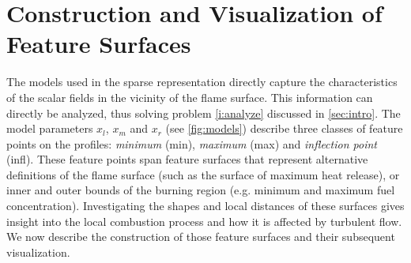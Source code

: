 \section{Construction and Visualization of Feature Surfaces}
\label{sec:visualization}
%
The models used in the sparse representation directly capture the
characteristics of the scalar fields in the vicinity of the flame surface. This
information can directly be analyzed, thus solving problem \ref{i:analyze}
discussed in \cref{sec:intro}. The model parameters $x_l$, $x_m$ and $x_r$ (see
\cref{fig:models}) describe three classes of feature points on the profiles:
\emph{minimum} (min), \emph{maximum} (max) and \emph{inflection point} (infl).
%
% 
These feature points span feature surfaces that represent alternative
definitions of the flame surface (such as the surface of maximum heat release),
or inner and outer bounds of the burning region (e.g. minimum and maximum fuel
concentration). Investigating the shapes and local distances of these surfaces
gives insight into the local combustion process and how it is affected
by turbulent flow. We now describe the construction of those feature surfaces
and their subsequent visualization.
%
%
%
%
